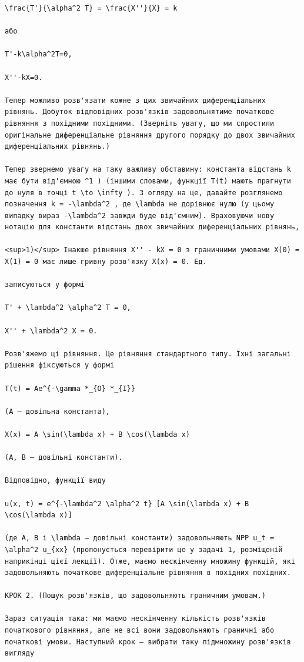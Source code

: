 \documentclass[
  ukrainian,
]{article}
\begin{document}
\begin{verbatim}
\frac{T'}{\alpha^2 T} = \frac{X''}{X} = k

або

T'-k\alpha^2T=0,

X''-kX=0.

Тепер можливо розв'язати кожне з цих звичайних диференціальних рівнянь. Добуток відповідних розв'язків задовольнятиме початкове рівняння з похідними похідними. (Зверніть увагу, що ми спростили оригінальне диференціальне рівняння другого порядку до двох звичайних диференціальних рівнянь.)

Тепер звернемо увагу на таку важливу обставину: константа відстань k має бути від'ємною ^1 ) (іншими словами, функції T(t) мають прагнути до нуля в точці t \to \infty ). З огляду на це, давайте розглянемо позначення k = -\lambda^2 , де \lambda не дорівнює нулю (у цьому випадку вираз -\lambda^2 завжди буде від'ємним). Враховуючи нову нотацію для константи відстань двох звичайних диференціальних рівнянь,

<sup>1)</sup> Інакше рівняння X'' - kX = 0 з граничними умовами X(0) = X(1) = 0 має лише гривну розв'язку X(x) = 0. Ед.

записуються у формі

T' + \lambda^2 \alpha^2 T = 0,

X'' + \lambda^2 X = 0.

Розв'яжемо ці рівняння. Це рівняння стандартного типу. Їхні загальні рішення фіксуються у формі

T(t) = Ae^{-\gamma *_{O} *_{I}}

(A — довільна константа),

X(x) = A \sin(\lambda x) + B \cos(\lambda x)

(A, B — довільні константи).

Відповідно, функції виду

u(x, t) = e^{-\lambda^2 \alpha^2 t} [A \sin(\lambda x) + B \cos(\lambda x)]

(де A, B і \lambda — довільні константи) задовольняють NPP u_t = \alpha^2 u_{xx} (пропонується перевірити це у задачі 1, розміщеній наприкінці цієї лекції). Отже, маємо нескінченну множину функцій, які задовольняють початкове диференціальне рівняння в похідних похідних.

КРОК 2. (Пошук розв'язків, що задовольняють граничним умовам.)

Зараз ситуація така: ми маємо нескінченну кількість розв'язків початкового рівняння, але не всі вони задовольняють граничні або початкові умови. Наступний крок — вибрати таку підмножину розв'язків вигляду


\end{verbatim}
\end{document}
